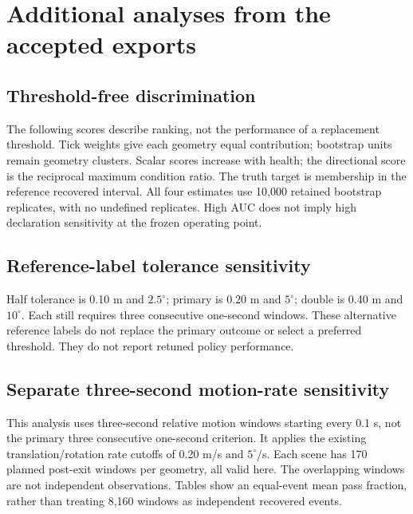 \documentclass[conference,onecolumn]{IEEEtran}
\begin{document}
\section{Additional analyses from the accepted exports}
\subsection{Threshold-free discrimination}
The following scores describe ranking, not the performance of a replacement
threshold. Tick weights give each geometry equal contribution; bootstrap units
remain geometry clusters. Scalar scores increase with health; the directional
score is the reciprocal maximum condition ratio. The truth target is membership
in the reference recovered interval. All four estimates use 10,000 retained
bootstrap replicates, with no undefined replicates. High AUC does not imply
high declaration sensitivity at the frozen operating point.
\begin{table}[ht]\centering\caption{Existing discrimination estimates. AP denotes average precision.}
\end{table}

\subsection{Reference-label tolerance sensitivity}
Half tolerance is 0.10 m and $2.5^\circ$; primary is 0.20 m and $5^\circ$;
double is 0.40 m and $10^\circ$. Each still requires three consecutive one-second
windows. These alternative reference labels do not replace the primary outcome
or select a preferred threshold. They do not report retuned policy performance.
\begin{table}[ht]\centering\caption{Recovered events under existing tolerance sensitivity labels.}
\end{table}
\begin{table}[ht]\centering\caption{Tolerance sensitivity separated by geometry group.}
\end{table}
\clearpage
\subsection{Separate three-second motion-rate sensitivity}
This analysis uses three-second relative motion windows starting every 0.1 s,
not the primary three consecutive one-second criterion. It applies the existing
translation/rotation rate cutoffs of 0.20 m/s and $5^\circ$/s. Each scene has
170 planned post-exit windows per geometry, all valid here. The overlapping
windows are not independent observations. Tables show an equal-event mean pass
fraction, rather than treating 8,160 windows as independent recovered events.
\begin{table}[ht]\centering\caption{Existing three-second rate sensitivity, pooled across geometries.}
\end{table}
\begin{table}[ht]\centering\caption{Existing three-second rate sensitivity by group.}
\end{table}
\end{document}
